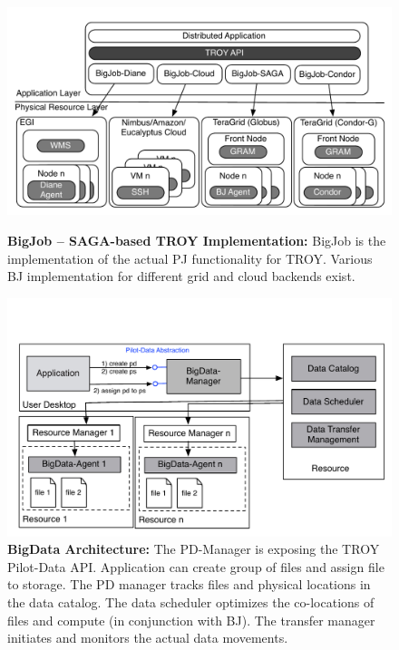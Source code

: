 \documentclass[conference,final]{IEEEtran}
\newcommand{\upp}{\vspace*{-0.5em}}
\begin{document}
\begin{figure}[t]
	\begin{minipage}[b]{0.475\linewidth}
	\centering
	\includegraphics[width=\textwidth]{figures/distributed_pilot_job.pdf}
	\caption{\textbf{BigJob -- SAGA-based TROY Implementation:} BigJob is the implementation of the actual PJ functionality for TROY. Various BJ implementation for different grid and cloud backends exist.}
	\label{fig:figures_distributed_pilot_job}
	\end{minipage}
	\hspace{0.035\linewidth}
	\begin{minipage}[b]{0.475\linewidth}
	\centering
   	\includegraphics[width=\textwidth]{figures/pilot-data-manager.pdf}
    \caption{\textbf{BigData Architecture:} The PD-Manager is exposing the 
	TROY Pilot-Data API. Application can create group of files and assign file
	to storage. The PD manager tracks files and physical locations in the data 
	catalog. The data scheduler optimizes the co-locations of files and compute 
	(in conjunction with BJ). The transfer manager initiates and monitors the 
	actual data movements. \upp\upp}
	\label{fig:pilot-data-architecture}
	\end{minipage}
\end{figure}
\end{document}
